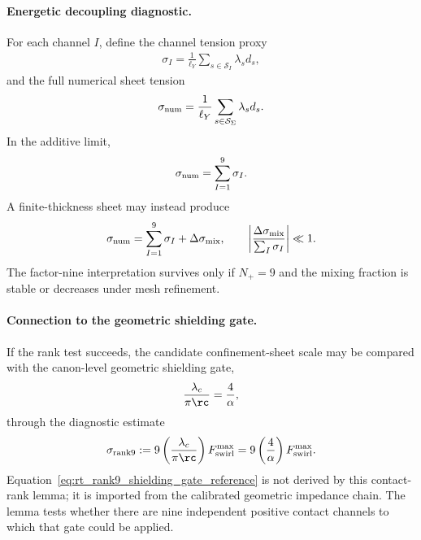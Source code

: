 \paragraph{Energetic decoupling diagnostic.}
For each channel \(I\), define the channel tension proxy
\begin{align}
    \sigma_I
    =
    \frac{1}{\ell_Y}
    \sum_{s\in\mathcal S_I}\lambda_s d_s,
    \label{eq:rt_rank9_channel_tension}
\end{align}
and the full numerical sheet tension
\begin{align}
    \sigma_{\rm num}
    =
    \frac{1}{\ell_Y}
    \sum_{s\in\mathcal S_{\Sigma}}\lambda_s d_s .
    \label{eq:rt_rank9_numerical_sheet_tension}
\end{align}
In the additive limit,
\begin{align}
    \sigma_{\rm num}
    =
    \sum_{I=1}^{9}\sigma_I .
    \label{eq:rt_rank9_additive_tension_limit}
\end{align}
A finite-thickness sheet may instead produce
\begin{align}
    \sigma_{\rm num}
    =
    \sum_{I=1}^{9}\sigma_I
    +
    \Delta\sigma_{\rm mix},
    \qquad
    \left|
    \frac{\Delta\sigma_{\rm mix}}{\sum_I\sigma_I}
    \right|
    \ll1 .
    \label{eq:rt_rank9_mixed_tension}
\end{align}
The factor-nine interpretation survives only if \(N_+=9\) and the mixing fraction
is stable or decreases under mesh refinement.

\paragraph{Connection to the geometric shielding gate.}
If the rank test succeeds, the candidate confinement-sheet scale may be compared
with the canon-level geometric shielding gate,
\begin{align}
    \frac{\lambda_c}{\pi\rc}
    =
    \frac{4}{\alpha},
    \label{eq:rt_rank9_shielding_gate_reference}
\end{align}
through the diagnostic estimate
\begin{align}
    \sigma_{\rm rank9}
    :=
    9
    \left(\frac{\lambda_c}{\pi\rc}\right)
    F_{\rm swirl}^{\max}
    =
    9\left(\frac{4}{\alpha}\right)F_{\rm swirl}^{\max}.
    \label{eq:rt_rank9_tension_diagnostic}
\end{align}
Equation~\eqref{eq:rt_rank9_shielding_gate_reference} is not derived by this
contact-rank lemma; it is imported from the calibrated geometric impedance chain.
The lemma tests whether there are nine independent positive contact channels to
which that gate could be applied.

